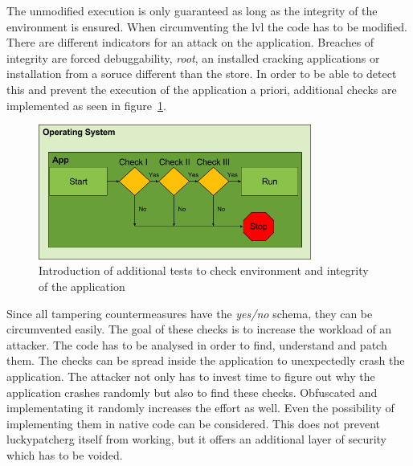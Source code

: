 The unmodified execution is only guaranteed as long as the integrity of the environment is ensured.
\newline
When circumventing the \gls{lvl} the code has to be modified.
There are different indicators for an attack on the application.
Breaches of integrity are forced debuggability, \textit{root}, an installed cracking applications or installation from a soruce different than the store.
\newline
In order to be able to detect this and prevent the execution of the application a priori, additional checks are implemented as seen in figure~\ref{fig:verificationNowAdditional}.
\begin{figure}[h]
    \centering
    \includegraphics[width=0.8\textwidth]{data/verificationNowAdditional.png}
    \caption{Introduction of additional tests to check environment and integrity of the application}
    \label{fig:verificationNowAdditional}
\end{figure}
Since all tampering countermeasures have the \textit{yes/no} schema, they can be circumvented easily.
The goal of these checks is to increase the workload of an attacker.
The code has to be analysed in order to find, understand and patch them.
The checks can be spread inside the application to unexpectedly crash the application.
The attacker not only has to invest time to figure out why the application crashes randomly but also to find these checks.
Obfuscated and implementating it randomly increases the effort as well.
Even the possibility of implementing them in native code can be considered.
\newline
This does not prevent \gls{luckypatcherg} itself from working, but it offers an additional layer of security which has to be voided.
